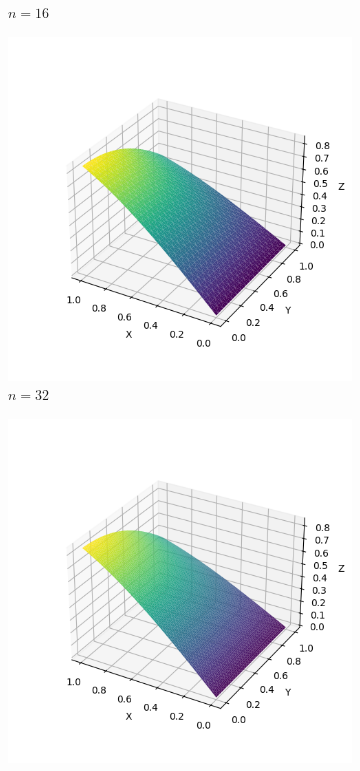\documentclass[lang=cn,a4paper,newtx,bibend=bibtex]{elegantpaper}
\begin{document}
\begin{figure}[H]
\begin{subfigure}[b]{0.18\textwidth}
      \caption{$n= 16$}
  \end{subfigure}
  \hfill
  \begin{subfigure}[b]{0.18\textwidth}
      \includegraphics[width=\textwidth]{../../res_bac/res-[data|2-Neumann-regular-c32].png}
      \caption{$n = 32$}
  \end{subfigure}
  \hfill
  \begin{subfigure}[b]{0.18\textwidth}
      \includegraphics[width=\textwidth]{../../res_bac/res-[data|2-Neumann-regular-d64].png}

\end{subfigure}
\end{figure}
\end{document}
